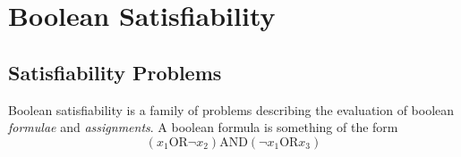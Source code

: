 \chapter{Boolean Satisfiability}
\section{Satisfiability Problems}
Boolean satisfiability is a family of problems describing the evaluation of boolean \emph{formulae} and \emph{assignments}.  A boolean formula is something of the form 
\begin{equation}
	(x_1 \text{OR} \neg x_2) \text{AND} (\neg x_1 \text{OR} x_3)
\end{equation}
